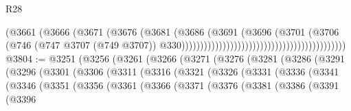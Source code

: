 \begin{lexlean}{R28}
\begin{coremodule}
                                                                      (@3661
                                                                        (@3666
                                                                          (@3671
                                                                            (@3676
                                                                              (@3681
                                                                                (@3686
                                                                                  (@3691
                                                                                    (@3696
                                                                                      (@3701
                                                                                        (@3706
                                                                                          (@746
                                                                                            (@747
                                                                                              @3707
                                                                                              (@749
                                                                                                @3707))
                                                                                            @330))))))))))))))))))))))))))))))))))))))))))))
@3804 := @3251
    (@3256
      (@3261
        (@3266
          (@3271
            (@3276
              (@3281
                (@3286
                  (@3291
                    (@3296
                      (@3301
                        (@3306
                          (@3311
                            (@3316
                              (@3321
                                (@3326
                                  (@3331
                                    (@3336
                                      (@3341
                                        (@3346
                                          (@3351
                                            (@3356
                                              (@3361
                                                (@3366
                                                  (@3371
                                                    (@3376
                                                      (@3381
                                                        (@3386
                                                          (@3391
                                                            (@3396

\end{coremodule}
\end{lexlean}
